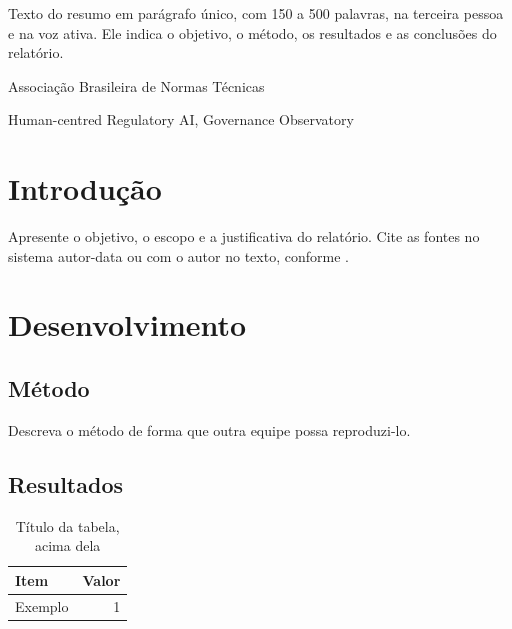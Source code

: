 \documentclass[12pt,a4paper,oneside,english,brazil]{abntex2}
\begin{document}

\pretextual
\imprimirfolhaderostorelatorio            %

\begin{resumorelatorio}                   %
Texto do resumo em parágrafo único, com 150 a 500 palavras, na terceira pessoa e na voz ativa.
Ele indica o objetivo, o método, os resultados e as conclusões do relatório.
\end{resumorelatorio}

\listoffigures*
\cleardoublepage
{}
\listoftables*
\cleardoublepage

\begin{siglas}
  \item[ABNT] Associação Brasileira de Normas Técnicas
  \item[HRAI-GO] Human-centred Regulatory AI, Governance Observatory
\end{siglas}

\tableofcontents*                          %
\cleardoublepage

\textual

\chapter{Introdução}
Apresente o objetivo, o escopo e a justificativa do relatório. Cite as fontes no sistema
autor-data \cite{nbr10719} ou com o autor no texto, conforme .

\chapter{Desenvolvimento}
\section{Método}
Descreva o método de forma que outra equipe possa reproduzi-lo.

\section{Resultados}
\begin{table}[htb]
  \caption{Título da tabela, acima dela}\label{tab:exemplo}
  \centering
  \begin{tabular}{lr}
    \toprule
    Item & Valor\\
    \midrule
    Exemplo & 1\\
    \bottomrule
  \end{tabular}
\end{table}
\end{document}
